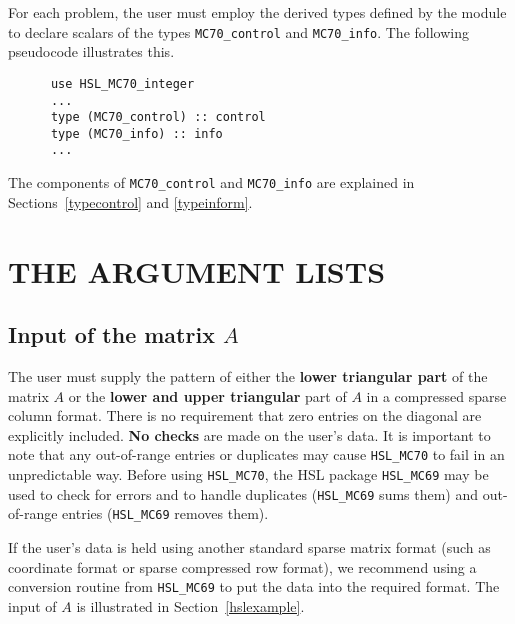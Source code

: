 \documentclass{stfc}
\newcommand{\packagename}{MC70}
\begin{document}
\hsltypes
\label{derived types}
For each problem, the user must employ the derived types defined by the
module to declare scalars of the types
{\tt MC70\_control} and {\tt MC70\_info}. 
The following pseudocode illustrates this.
\begin{verbatim}
      use HSL_MC70_integer    
      ...
      type (MC70_control) :: control       
      type (MC70_info) :: info
      ...
\end{verbatim}
The components of {\tt MC70\_control} and {\tt MC70\_info} are explained
in Sections~\ref{typecontrol} and \ref{typeinform}.
 


\section{THE ARGUMENT LISTS\label{ArgLists}}


\subsection{Input of the matrix $A$}
The user must supply the pattern of either the {\bf lower triangular part} of the matrix $A$ 
or the {\bf lower and upper triangular} part of $A$ 
in a compressed sparse column format. There is 
no requirement that zero entries on the diagonal are explicitly included. 
{\bf No checks} are made on the user's data. It is important to note
that any out-of-range entries or duplicates may cause {\tt HSL\_\packagename}
to fail in an unpredictable way. Before using {\tt HSL\_\packagename},
the HSL package {\tt HSL\_MC69} may  be used to check for errors and to handle
duplicates ({\tt HSL\_MC69} sums them) and out-of-range entries 
({\tt HSL\_MC69} removes them).

If the user's data is held using
another standard sparse matrix format (such as coordinate format
or sparse compressed row format), we recommend using
a conversion routine from {\tt HSL\_MC69} to put the data into the required format. 
The input of $A$ is illustrated in Section~\ref{hslexample}.
\end{document}
